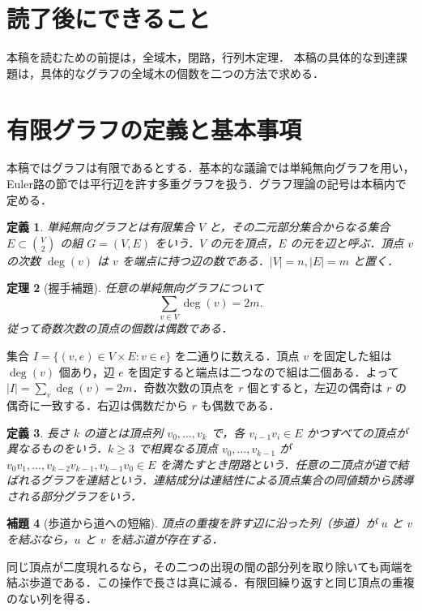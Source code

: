 \documentclass[a5paper,10pt,onecolumn]{jsarticle}
\makeatletter
\theoremstyle{mathnotetheorem}
\newtheorem{theorem}{定理}[section]
\newtheorem{definition}[theorem]{定義}
\newtheorem{lemma}[theorem]{補題}
\renewcommand{\proofname}{証明}
\renewenvironment{proof}[1][\proofname]{%
  \par\pushQED{\qed}\normalfont\topsep4\p@\@plus2\p@\relax
  \trivlist\item[\hskip\labelsep\bfseries #1]\ignorespaces
}{\popQED\endtrivlist\@endpefalse}
\makeatother
\begin{document}
\section*{読了後にできること}
本稿を読むための前提は，全域木，閉路，行列木定理．
本稿の具体的な到達課題は，具体的なグラフの全域木の個数を二つの方法で求める．

\section{有限グラフの定義と基本事項}
本稿ではグラフは有限であるとする．基本的な議論では単純無向グラフを用い，Euler路の節では平行辺を許す多重グラフを扱う．グラフ理論の記号は本稿内で定める．

\begin{definition}
\emph{単純無向グラフ}とは有限集合 $V$ と，その二元部分集合からなる集合 $E\subset\binom{V}{2}$ の組 $G=(V,E)$ をいう．$V$ の元を頂点，$E$ の元を辺と呼ぶ．頂点 $v$ の次数 $\deg(v)$ は $v$ を端点に持つ辺の数である．$|V|=n,|E|=m$ と置く．
\end{definition}
\begin{theorem}[握手補題]\label{thm:handshake}
任意の単純無向グラフについて
\[
 \sum_{v\in V}\deg(v)=2m.
\]
従って奇数次数の頂点の個数は偶数である．
\end{theorem}
\begin{proof}
集合 $I=\{(v,e)\in V\times E:v\in e\}$ を二通りに数える．頂点 $v$ を固定した組は $\deg(v)$ 個あり，辺 $e$ を固定すると端点は二つなので組は二個ある．よって $|I|=\sum_v\deg(v)=2m$．奇数次数の頂点を $r$ 個とすると，左辺の偶奇は $r$ の偶奇に一致する．右辺は偶数だから $r$ も偶数である．
\end{proof}

\begin{definition}
長さ $k$ の\emph{道}とは頂点列 $v_0,\dots,v_k$ で，各 $v_{i-1}v_i\in E$ かつすべての頂点が異なるものをいう．$k\ge3$ で相異なる頂点 $v_0,\dots,v_{k-1}$ が $v_0v_1,\dots,v_{k-2}v_{k-1},v_{k-1}v_0\in E$ を満たすとき\emph{閉路}という．任意の二頂点が道で結ばれるグラフを\emph{連結}という．\emph{連結成分}は連結性による頂点集合の同値類から誘導される部分グラフをいう．
\end{definition}

\begin{lemma}[歩道から道への短縮]\label{lem:shorten}
頂点の重複を許す辺に沿った列（歩道）が $u$ と $v$ を結ぶなら，$u$ と $v$ を結ぶ道が存在する．
\end{lemma}
\begin{proof}
同じ頂点が二度現れるなら，その二つの出現の間の部分列を取り除いても両端を結ぶ歩道である．この操作で長さは真に減る．有限回繰り返すと同じ頂点の重複のない列を得る．
\end{proof}
\end{document}
